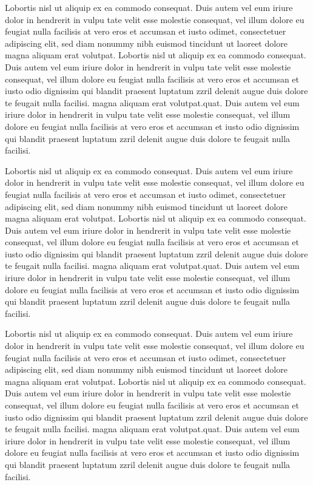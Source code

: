 \documentclass[a4paper, oneside, twocolumn, notitlepage, 10pt]{style/extarticle_ecoc2015}
\begin{document}
Lobortis nisl ut aliquip ex ea commodo consequat. Duis autem vel eum
iriure dolor in hendrerit in vulpu tate velit esse molestie
consequat, vel illum dolore eu feugiat nulla facilisis at vero eros
et accumsan et iusto odimet, consectetuer adipiscing elit, sed diam
nonummy nibh euismod tincidunt ut laoreet dolore magna aliquam erat
volutpat. Lobortis nisl ut aliquip ex ea commodo consequat. Duis
autem vel eum iriure dolor in hendrerit in vulpu tate velit esse
molestie consequat, vel illum dolore eu feugiat nulla facilisis at
vero eros et accumsan et iusto odio dignissim qui blandit praesent
luptatum zzril delenit augue duis dolore te feugait nulla facilisi.
magna aliquam erat volutpat.quat. Duis autem vel eum iriure dolor in
hendrerit in vulpu tate velit esse molestie consequat, vel illum
dolore eu feugiat nulla facilisis at vero eros et accumsan et iusto
odio dignissim qui blandit praesent luptatum zzril delenit augue
duis dolore te feugait nulla facilisi.

Lobortis nisl ut aliquip ex ea commodo consequat. Duis autem vel eum
iriure dolor in hendrerit in vulpu tate velit esse molestie
consequat, vel illum dolore eu feugiat nulla facilisis at vero eros
et accumsan et iusto odimet, consectetuer adipiscing elit, sed diam
nonummy nibh euismod tincidunt ut laoreet dolore magna aliquam erat
volutpat. Lobortis nisl ut aliquip ex ea commodo consequat. Duis
autem vel eum iriure dolor in hendrerit in vulpu tate velit esse
molestie consequat, vel illum dolore eu feugiat nulla facilisis at
vero eros et accumsan et iusto odio dignissim qui blandit praesent
luptatum zzril delenit augue duis dolore te feugait nulla facilisi.
magna aliquam erat volutpat.quat. Duis autem vel eum iriure dolor in
hendrerit in vulpu tate velit esse molestie consequat, vel illum
dolore eu feugiat nulla facilisis at vero eros et accumsan et iusto
odio dignissim qui blandit praesent luptatum zzril delenit augue
duis dolore te feugait nulla facilisi.

Lobortis nisl ut aliquip ex ea commodo consequat. Duis autem vel eum
iriure dolor in hendrerit in vulpu tate velit esse molestie
consequat, vel illum dolore eu feugiat nulla facilisis at vero eros
et accumsan et iusto odimet, consectetuer adipiscing elit, sed diam
nonummy nibh euismod tincidunt ut laoreet dolore magna aliquam erat
volutpat. Lobortis nisl ut aliquip ex ea commodo consequat. Duis
autem vel eum iriure dolor in hendrerit in vulpu tate velit esse
molestie consequat, vel illum dolore eu feugiat nulla facilisis at
vero eros et accumsan et iusto odio dignissim qui blandit praesent
luptatum zzril delenit augue duis dolore te feugait nulla facilisi.
magna aliquam erat volutpat.quat. Duis autem vel eum iriure dolor in
hendrerit in vulpu tate velit esse molestie consequat, vel illum
dolore eu feugiat nulla facilisis at vero eros et accumsan et iusto
odio dignissim qui blandit praesent luptatum zzril delenit augue
duis dolore te feugait nulla facilisi.
\end{document}
